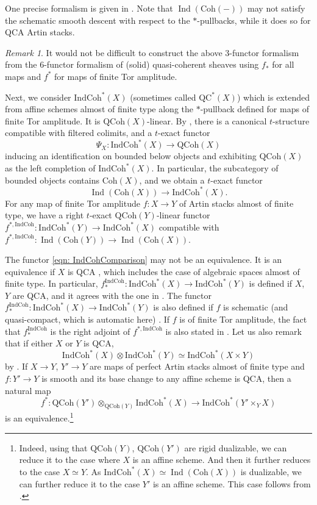 \documentclass{amsart}
\theoremstyle{definition}
\theoremstyle{remark}
\newtheorem{remark}[theorem]{Remark}
\numberwithin{equation}{section}
\DeclareMathOperator{\Ind}{Ind}
\newcommand{\IndCoh}{\mathrm{IndCoh}}
\newcommand{\QCoh}{\mathrm{QCoh}}
\newcommand{\Coh}{\mathrm{Coh}}
\begin{document}
One precise formalism is given in \cite[Theorem 9.32]{ZhuTame}. Note that $\Ind(\Coh(-))$ may not satisfy the schematic smooth descent with respect to the $*$-pullbacks, while it does so for QCA Artin stacks. 

\begin{remark}
It would not be difficult to construct the above 3-functor formalism from the 6-functor formalism of (solid) quasi-coherent sheaves using $f_*$ for all maps and $f^*$ for maps of finite Tor amplitude. 
\end{remark}

Next, we consider $\IndCoh^*(X)$ (sometimes called $\mathrm{QC}^*(X)$) which is extended from affine schemes almost of finite type along the $*$-pullback defined for maps of finite Tor amplitude. It is $\QCoh(X)$-linear. By \cite[Proposition 11.7.5]{GaitsgoryIndCohSheaves}, there is a canonical $t$-structure compatible with filtered colimits, and a $t$-exact functor
\[
\Psi_X\colon \IndCoh^*(X)\to \QCoh(X)
\]
inducing an identification on bounded below objects and exhibiting $\QCoh(X)$ as the left completion of $\IndCoh^* (X)$. In particular, the subcategory of bounded objects contains $\Coh(X)$, and we obtain a $t$-exact functor
\begin{equation}\label{eqn: IndCohComparison}
\Ind(\Coh(X))\to \IndCoh^*(X).     
\end{equation}
For any map of finite Tor amplitude $f\colon X\to Y$ of Artin stacks almost of finite type, we have a right $t$-exact $\QCoh(Y)$-linear functor $f^{*, \IndCoh}\colon \IndCoh^*(Y)\to \IndCoh^*(X)$ compatible with $f^{*,\IndCoh}\colon \Ind(\Coh(Y))\to \Ind(\Coh(X))$. 

The functor \eqref{eqn: IndCohComparison} may not be an equivalence. It is an equivalence if $X$ is QCA \cite[Theorem 3.3.5]{DrinfeldGaitsgory}, which includes the case of algebraic spaces almost of finite type. In particular, $f_*^{\IndCoh}\colon \IndCoh^* (X)\to \IndCoh^*(Y)$ is defined if $X$, $Y$ are QCA, and it agrees with the one in \cite[\S 3.6]{DrinfeldGaitsgory}. The functor $f_*^{\IndCoh}\colon \IndCoh^* (X)\to \IndCoh^*(Y)$ is also defined if $f$ is schematic (and quasi-compact, which is automatic here) \cite[\S 10.6]{GaitsgoryIndCohSheaves}. If $f$ is of finite Tor amplitude, the fact that $f_*^{\IndCoh}$ is the right adjoint of $f^{*,\IndCoh}$ is also stated in \cite[Corollary 3.7.13]{DrinfeldGaitsgory}. Let us also remark that if either $X$ or $Y$ is QCA, 
\[
\IndCoh^*(X)\otimes\IndCoh^* (Y)\simeq \IndCoh^* (X\times Y)
\]
by \cite[Corollary 4.2.3]{DrinfeldGaitsgory}.  If $ X\to Y$, $Y'\to Y$ are maps of perfect Artin stacks almost of finite type and $f\colon Y'\to Y$ is smooth and its base change to any affine scheme is QCA, then a natural map
\[
f^*\colon \QCoh(Y')\otimes_{\QCoh(Y)}\IndCoh^*(X) \to \IndCoh^*(Y'\times_Y X)
\]
is an equivalence.\footnote{Indeed, using that $\QCoh(Y)$, $\QCoh(Y')$ are rigid dualizable, we can reduce it to the case where $X$ is an affine scheme. And then it further reduces to the case $X\simeq Y$. As $\IndCoh^*(X)\simeq \Ind(\Coh(X))$ is dualizable, we can further reduce it to the case $Y'$ is an affine scheme. This case follows from \cite[Proposition 4.5.3]{GaitsgoryIndCohSheaves}.}
\end{document}

